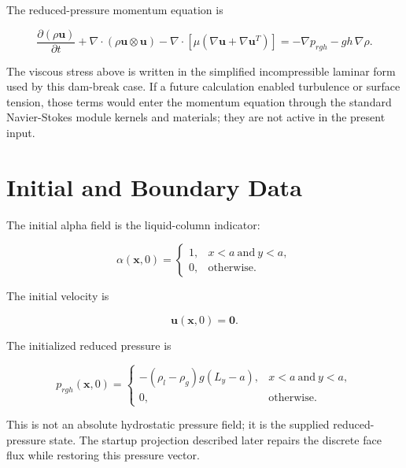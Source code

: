 \documentclass[11pt]{article}
\newcommand{\grad}{\nabla}
\newcommand{\divergence}{\nabla\!\cdot}
\begin{document}
The reduced-pressure momentum equation is

\begin{equation}
  \frac{\partial(\rho\mathbf{u})}{\partial t}
  +
  \divergence(\rho\mathbf{u}\otimes\mathbf{u})
  -
  \divergence
  \left[
    \mu
    \left(\grad\mathbf{u}+\grad\mathbf{u}^{T}\right)
  \right]
  =
  -\grad p_{rgh}
  -
  gh\,\grad\rho.
  \label{eq:momentum-prgh}
\end{equation}

The viscous stress above is written in the simplified incompressible laminar
form used by this dam-break case.  If a future calculation enabled turbulence
or surface tension, those terms would enter the momentum equation through the
standard Navier-Stokes module kernels and materials; they are not active in the
present input.

\section{Initial and Boundary Data}

The initial alpha field is the liquid-column indicator:

\begin{equation}
  \alpha(\mathbf{x},0)
  =
  \begin{cases}
    1, & x<a\ \text{and}\ y<a, \\
    0, & \text{otherwise}.
  \end{cases}
\end{equation}

The initial velocity is

\begin{equation}
  \mathbf{u}(\mathbf{x},0)=\mathbf{0}.
\end{equation}

The initialized reduced pressure is

\begin{equation}
  p_{rgh}(\mathbf{x},0)
  =
  \begin{cases}
    -(\rho_l-\rho_g)g(L_y-a), & x<a\ \text{and}\ y<a, \\
    0, & \text{otherwise}.
  \end{cases}
  \label{eq:init-prgh}
\end{equation}

This is not an absolute hydrostatic pressure field; it is the supplied
reduced-pressure state.  The startup projection described later repairs the
discrete face flux while restoring this pressure vector.
\end{document}
